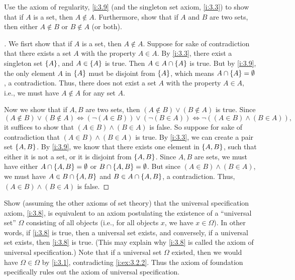 \begin{ex}\label{i:ex:3.2.2}
  Use the axiom of regularity, \cref{i:3.9} (and the singleton set axiom, \cref{i:3.3}) to show that if \(A\) is a set, then \(A \notin A\).
  Furthermore, show that if \(A\) and \(B\) are two sets, then either \(A \notin B\) or \(B \notin A\) (or both).
\end{ex}

\begin{proof}[]
  We fisrt show that if \(A\) is a set, then \(A \notin A\).
  Suppose for sake of contradiction that there exists a set \(A\) with the property \(A \in A\).
  By \cref{i:3.3}, there exist a singleton set \(\left\lbrace A\right\rbrace\), and \(A \in \left\lbrace A\right\rbrace\) is true.
  Then \(A \in A \cap \left\lbrace A\right\rbrace\) is true.
  But by \cref{i:3.9}, the only element \(A\) in \(\left\lbrace A\right\rbrace\) must be disjoint from \(\left\lbrace A\right\rbrace\), which means \(A \cap \left\lbrace A\right\rbrace = \emptyset\), a contradiction.
  Thus, there does not exist a set \(A\) with the property \(A \in A\), i.e., we must have \(A \notin A\) for any set \(A\).

  Now we show that if \(A, B\) are two sets, then \((A \notin B) \lor (B \notin A)\) is true.
  Since
  \[
    (A \notin B) \lor (B \notin A) \iff (\lnot(A \in B)) \lor (\lnot(B \in A)) \iff \lnot ((A \in B) \land (B \in A)),
  \]
  it suffices to show that \((A \in B) \land (B \in A)\) is false.
  So suppose for sake of contradiction that \((A \in B) \land (B \in A)\) is true.
  By \cref{i:3.3}, we can create a pair set \(\left\lbrace A, B\right\rbrace\).
  By \cref{i:3.9}, we know that there exists one element in \(\left\lbrace A, B\right\rbrace\), such that either it is not a set, or it is disjoint from \(\left\lbrace A, B\right\rbrace\).
  Since \(A, B\) are sets, we must have either \(A \cap \left\lbrace A, B\right\rbrace = \emptyset\) or \(B \cap \left\lbrace A, B\right\rbrace = \emptyset\).
  But since \((A \in B) \land (B \in A)\), we must have \(A \in B \cap \left\lbrace A, B\right\rbrace\) and \(B \in A \cap \left\lbrace A, B\right\rbrace\), a contradiction.
  Thus, \((A \in B) \land (B \in A)\) is false.
\end{proof}

\begin{ex}\label{i:ex:3.2.3}
  Show (assuming the other axioms of set theory) that the universal specification axiom, \cref{i:3.8}, is equivalent to an axiom postulating the existence of a ``universal set'' \(\Omega\) consisting of all objects (i.e., for all objects \(x\), we have \(x \in \Omega\)).
  In other words, if \cref{i:3.8} is true, then a universal set exists, and conversely, if a universal set exists, then \cref{i:3.8} is true.
  (This may explain why \cref{i:3.8} is called the axiom of universal specification.)
  Note that if a universal set \(\Omega\) existed, then we would have \(\Omega \in \Omega\) by \cref{i:3.1}, contradicting \cref{i:ex:3.2.2}.
  Thus the axiom of foundation specifically rules out the axiom of universal specification.
\end{ex}

